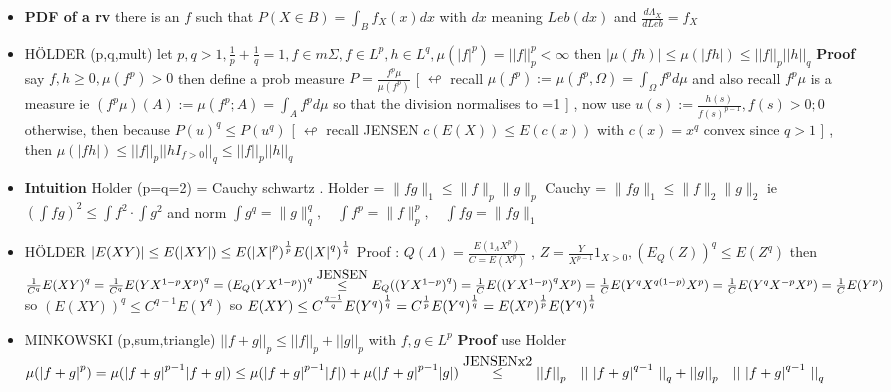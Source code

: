 \documentclass[10pt,landscape,a4paper]{article}
\newcommand\myle[1]{\stackrel{{\normalfont\mbox{#1}}}{ \le }}
\begin{document}
\begin{multicols*}{3}
\begin{spacing}{0.5}
\begin{itemize}
\item \textbf{PDF of a rv} there is an $f$ such that $P(X \in B) = \int_B f_X(x) dx$ with $dx$ meaning $Leb(dx)$ and $\frac{d\Lambda_X}{dLeb} = f_X$

\item \colorbox{green!10}{H\"{O}LDER (p,q,mult)} let $ p,q > 1, \frac{1}{p} + \frac{1}{q} =1 , f \in m\Sigma, f \in L^p, h \in L^q, \mu({|f|}^p) = {||f||}_p^p < \infty$ then \colorbox{green!10}{ $|\mu(fh)| \le \mu(|fh|) \le {||f||}_p {||h||}_q$} \textbf{Proof} say $f,h \ge 0, \mu(f^p)>0$ then define a prob measure  $P=\frac{f^p\mu}{\mu(f^p)}$ [ $\looparrowleft$ recall $\mu(f^p) := \mu(f^p,\Omega) = \int_{\Omega}f^pd\mu$ and also recall $f^p\mu$ is a measure ie $(f^p\mu)(A) := \mu(f^p;A)=\int_{A}f^p d\mu$ so that the division normalises to =1 ] , now use  $u(s) := \frac{h(s)}{ {f(s)}^{p-1}},f(s)>0; 0 $ otherwise, then because ${P(u)}^q \le P(u^q)$ [ $\looparrowleft$ recall JENSEN $c(E(X)) \le E(c(x))$ with $c(x) = x^q $ convex since $q >1$ ] , then $\mu(|fh|) \le {||f||}_p {||hI_{f>0}||}_q \le {||f||}_p {||h||}_q$ 
\item \textbf{Intuition} Holder (p=q=2) = Cauchy schwartz . Holder = $\|fg\|_1\le\|f\|_p\|g\|_p$ Cauchy = $\|fg\|_1\le\|f\|_2\|g\|_2$ ie $\left(\int fg\right)^2\leqslant\int f^2\cdot\int g^2$ and norm $ \int g^q=\|g\|_q^q,\quad \int f^p=\|f\|_p^p,\quad \int fg=\|fg\|_1 $

\item \colorbox{green!10}{H\"{O}LDER $|E(XY)| \le E(|XY|) \le {E({|X|}^p)}^{1 \over p} {E({|X|}^q)}^{1 \over q}$} Proof : $Q(\Lambda) =  \frac{E(1_{\Lambda}X^p)}{C=E(X^p)} $ , $Z=\frac{Y}{X^{p-1}}1_{X>0} , {(E_Q(Z))}^q \le E(Z^q) $ then $ {1\over {C^q}} E{(XY)}^q = {1\over {C^q}} E{(Y X^{1-p} X^{p} )}^q = {(E_Q(YX^{1-p}))}^q \myle{JENSEN} E_Q( {(YX^{1-p})}^q) = {1 \over C} E ( {(YX^{1-p})}^q X^p) = {1 \over C} E ( Y^q X^{q(1-p)}X^p) = {1 \over C} E(Y^q X^{-p} X^p) = {1 \over C} E(Y^p) $ so ${(E(XY))}^q \le C^{q-1} E(Y^q)$ so $E(XY) \le C^{ {q-1} \over {q}} {E(Y^q)}^{ 1 \over q} = C ^{1 \over p} {E(Y^q)}^{ 1 \over q} =  {E(X^p)}^{ 1 \over p} {E(Y^q)}^{ 1 \over q}  $

\item \colorbox{green!10}{MINKOWSKI (p,sum,triangle) ${||f+g||}_p \le {||f||}_p + {||g||}_p  $ } with $f,g \in L^p$ \textbf{Proof} use Holder $\mu({|f+g|}^p) = \mu({|f+g|}^{p-1}|f+g|) \le \mu({|f+g|}^{p-1}|f|) +  \mu({|f+g|}^{p-1}|g|) \myle{JENSENx2} {||f||}_p \quad {||\ {|f+g|}^{q-1}\  ||}_q + {||g||}_p \quad {||\ {|f+g|}^{q-1}\  ||}_q $ 


\end{itemize}
\end{spacing}
\end{multicols*}
\end{document}
